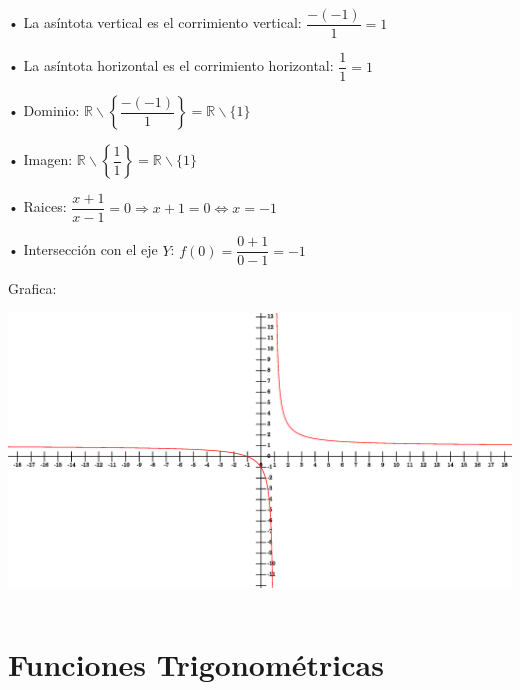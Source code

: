 \hfill \\
\quad \\


• La asíntota vertical es el corrimiento vertical: $\dfrac{-(-1)}{1} = 1$

• La asíntota horizontal es el corrimiento horizontal: $\dfrac{1}{1} = 1$

• Dominio: $\mathbb{R}\smallsetminus \left\{\dfrac{-(-1)}{1}\right\} =
\mathbb{R}\smallsetminus \{1\} $

• Imagen: $\mathbb{R}\smallsetminus \left\{\dfrac{1}{1}\right\} = 
\mathbb{R}\smallsetminus \{1\}$

• Raices: $\dfrac{x+1}{x-1} =0 \Rightarrow x+1=0 \Leftrightarrow x=-1$

• Intersección con el eje $Y$: $f(0) = \dfrac{0+1}{0-1} = -1$

Grafica:\\
\includegraphics[height=8cm,width=14cm]{hipej.eps} 

\section{Funciones Trigonométricas}
